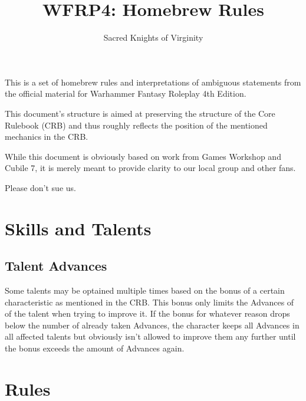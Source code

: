\documentclass[parskip=full,11pt]{wfrp-short}
\title{WFRP4: Homebrew Rules}
\author{Sacred Knights of Virginity}
\begin{document}
\maketitle
\thispagestyle{empty} %

\section*{} %
\vspace{5pt}
This is a set of homebrew rules and interpretations of ambiguous statements
from the official material for Warhammer Fantasy Roleplay 4th Edition.

This document's structure is aimed at preserving the structure of the Core
Rulebook (CRB) and thus roughly reflects the position of the mentioned
mechanics in the CRB.

While this document is obviously based on work from Games Workshop and Cubile
7, it is merely meant to provide clarity to our local group and other fans.

Please don't sue us.

\pagebreak
\tableofcontents

\pagebreak

\section{Skills and Talents}

\subsection{Talent Advances}
Some talents may be optained multiple times based on the bonus of a certain
characteristic as mentioned in the CRB. This bonus only limits the Advances of
of the talent when trying to improve it. If the bonus for whatever reason drops
below the number of already taken Advances, the character keeps all Advances in
all affected talents but obviously isn't allowed to improve them any further
until the bonus exceeds the amount of Advances again.

\section{Rules}
\end{document}
